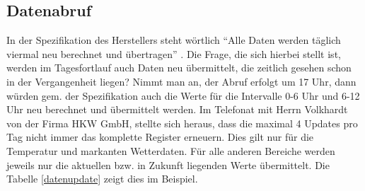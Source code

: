 \subsection{Datenabruf}
In der Spezifikation des Herstellers steht wörtlich \enquote{Alle Daten werden täglich viermal neu berechnet und übertragen} \cite[S. 4]{HKWDoc}. Die Frage, die sich hierbei stellt ist, werden im Tagesfortlauf auch Daten neu übermittelt, die zeitlich gesehen schon in der Vergangenheit liegen? Nimmt man an, der Abruf erfolgt um 17 Uhr, dann würden gem. der Spezifikation auch die Werte für die Intervalle 0-6 Uhr und 6-12 Uhr neu berechnet und übermittelt werden. Im Telefonat mit Herrn Volkhardt von der Firma HKW GmbH, stellte sich heraus, dass die maximal 4 Updates pro Tag nicht immer das komplette Register erneuern. Dies gilt nur für die Temperatur und markanten Wetterdaten. Für alle anderen Bereiche werden jeweils nur die aktuellen bzw. in Zukunft liegenden Werte übermittelt. Die Tabelle \ref{datenupdate} zeigt dies im Beispiel.
